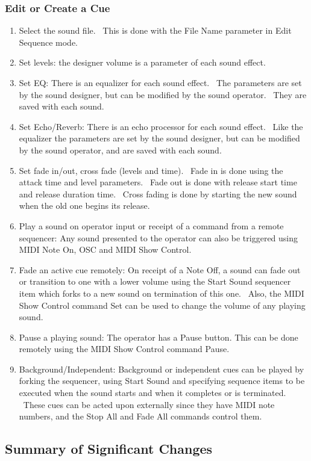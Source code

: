 \documentclass[letterpaper]{article}
\newcommand\liststyleLxxv{%
\renewcommand\theenumi{\arabic{enumi}}
\renewcommand\theenumii{\arabic{enumii}}
\renewcommand\theenumiii{\arabic{enumiii}}
\renewcommand\theenumiv{\arabic{enumiv}}
\renewcommand\labelenumi{\theenumi.}
\renewcommand\labelenumii{\theenumii.}
\renewcommand\labelenumiii{\theenumiii.}
\renewcommand\labelenumiv{\theenumiv.}
}
\begin{document}
\subsubsection{Edit or Create a Cue}
\liststyleLxxv
\begin{enumerate}
\item Select the sound file. \ This is done with the File Name parameter
in Edit Sequence mode.
\item Set levels: the designer volume is a parameter of each sound
effect.
\item Set EQ: There is an equalizer for each sound effect. \ The
parameters are set by the sound designer, but can be modified by the
sound operator. \ They are saved with each sound.
\item Set Echo/Reverb: There is an echo processor for each sound effect.
\ Like the equalizer the parameters are set by the sound designer, but
can be modified by the sound operator, and are saved with each sound.
\item Set fade in/out, cross fade (levels and time). \ Fade in is done
using the attack time and level parameters. \ Fade out is done with
release start time and release duration time. \ Cross fading is done by
starting the new sound when the old one begins its release.
\item Play a sound on operator input or receipt of a command from a
remote sequencer: Any sound presented to the operator can also be
triggered using MIDI Note On, OSC and MIDI Show Control.
\item Fade an active cue remotely: On receipt of a Note Off, a sound can
fade out or transition to one with a lower volume using the Start Sound
sequencer item which forks to a new sound on termination of this one.
\ Also, the MIDI Show Control command Set can be used to change the
volume of any playing sound.
\item Pause a playing sound: The operator has a Pause button. This can
be done remotely using the MIDI Show Control command Pause.
\item Background/Independent: Background or independent cues can be
played by forking the sequencer, using Start Sound and specifying
sequence items to be executed when the sound starts and when it
completes or is terminated. \ These cues can be acted upon externally
since they have MIDI note numbers, and the Stop All and Fade All
commands control them.
\end{enumerate}
\subsection[Summary of Significant Changes]{Summary of Significant
Changes}
\end{document}
